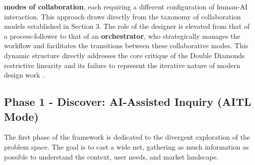 \documentclass[
  12pt,
  a4paper,
  bibliography=totoc,
  numbers=noenddot
]{scrartcl}
\begin{document}
\textbf{modes of collaboration}, each requiring a different
configuration of human-AI interaction. This approach draws directly from
the taxonomy of collaboration models established in Section 3. The role
of the designer is elevated from that of a process-follower to that of
an \textbf{orchestrator}, who strategically manages the workflow and
facilitates the transitions between these collaborative modes. This
dynamic structure directly addresses the core critique of the Double
Diamond\textquotesingle s restrictive linearity and its failure to
represent the iterative nature of modern design
work \cite{medium2025double}.

\subsection{Phase 1 - Discover:
AI-Assisted Inquiry (AITL
Mode)}\label{phase-1---discover-ai-assisted-inquiry-aitl-mode}

The first phase of the framework is dedicated to the divergent
exploration of the problem space. The goal is to cast a wide net,
gathering as much information as possible to understand the context,
user needs, and market landscape.
\end{document}
